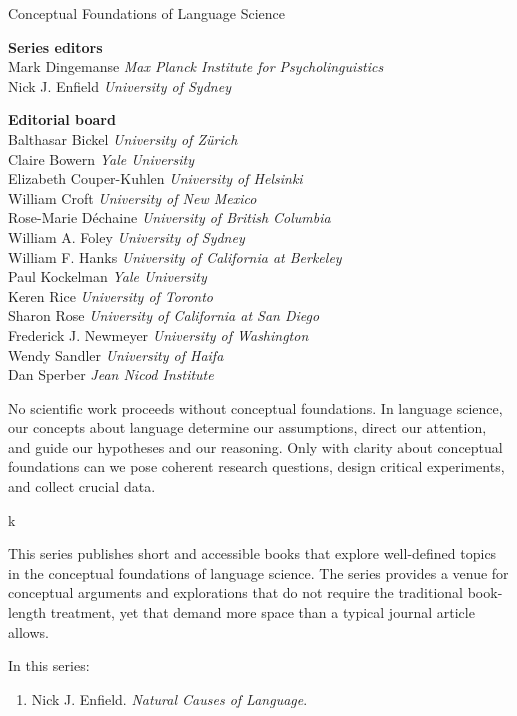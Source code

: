 {\large Conceptual Foundations of Language Science}

\bigskip

\textbf{Series editors}\\
Mark Dingemanse \textit{Max Planck Institute for Psycholinguistics}   \\
Nick J. Enfield \textit{University of Sydney}


\bigskip


\textbf{Editorial board} \\
Balthasar Bickel \textit{University of Zürich}   \\
Claire Bowern \textit{Yale University}          \\
Elizabeth Couper-Kuhlen \textit{University of Helsinki}    \\
William Croft \textit{University of New Mexico}            \\
Rose-Marie Déchaine \textit{University of British Columbia}      \\
William A. Foley \textit{University of Sydney}                   \\
William F. Hanks \textit{University of California at Berkeley}   \\
Paul Kockelman \textit{Yale University}           \\
Keren Rice \textit{University of Toronto}         \\
Sharon Rose \textit{University of California at San Diego }       \\
Frederick J. Newmeyer \textit{University of Washington}        \\
Wendy Sandler \textit{University of Haifa }            \\
Dan Sperber \textit{Jean Nicod Institute}     \\


\bigskip

\begin{minipage}{\textwidth}%

No scientific work proceeds without conceptual foundations. In language science, our concepts about language determine our assumptions, direct our attention, and guide our hypotheses and our reasoning. Only with clarity about conceptual foundations can we pose coherent research questions, design critical experiments, and collect crucial data. 

k\midskip

This series publishes short and accessible books that explore well-defined topics in the conceptual foundations of language science. The series provides a venue for conceptual arguments and explorations that do not require the traditional book-length treatment, yet that demand more space than a typical journal article allows.  
\end{minipage}

\bigskip

In this series:

\begin{enumerate}
\item Nick J. Enfield. \textit{Natural Causes of Language}.

\end{enumerate}

% 
% 


